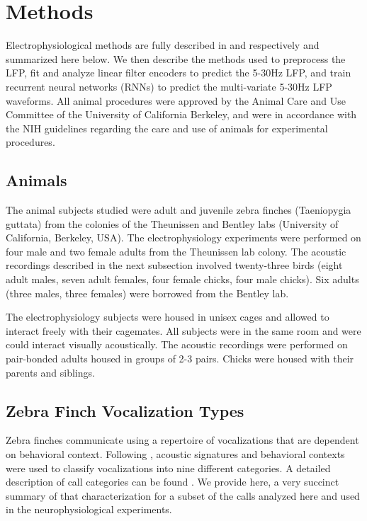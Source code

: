 \section{Methods}


Electrophysiological methods are fully described in \cite{Elie2015a} and \cite{Elie2015b} respectively and summarized here below. We then describe the methods used to preprocess the LFP, fit and analyze linear filter encoders to predict the 5-30Hz LFP, and train recurrent neural networks (RNNs) to predict the multi-variate 5-30Hz LFP waveforms. All animal procedures were approved by the Animal Care and Use Committee of the University of California Berkeley, and were in accordance with the NIH guidelines regarding the care and use of animals for experimental procedures.

\subsection{Animals}

The animal subjects studied were adult and juvenile zebra finches (Taeniopygia guttata) from the colonies of the Theunissen and Bentley labs (University of California, Berkeley, USA). The electrophysiology experiments were performed on four male and two female adults from the Theunissen lab colony. The acoustic recordings described in the next subsection involved twenty-three birds (eight adult males, seven adult females, four female chicks, four male chicks). Six adults (three males, three females) were borrowed from the Bentley lab.

The electrophysiology subjects were housed in unisex cages and allowed to interact freely with their cagemates. All subjects were in the same room and were could interact visually acoustically. The acoustic recordings were performed on pair-bonded adults housed in groups of 2-3 pairs. Chicks were housed with their parents and siblings.
    
\subsection{Zebra Finch Vocalization Types}

Zebra finches communicate using a repertoire of vocalizations that are dependent on behavioral context. Following \cite{Zann1996}, acoustic signatures and behavioral contexts were used to classify vocalizations into nine different categories. A detailed description of call categories can be found \cite{Elie2015a}. We provide here, a very succinct summary of that characterization for a subset of the calls analyzed here and used in the neurophysiological experiments.

